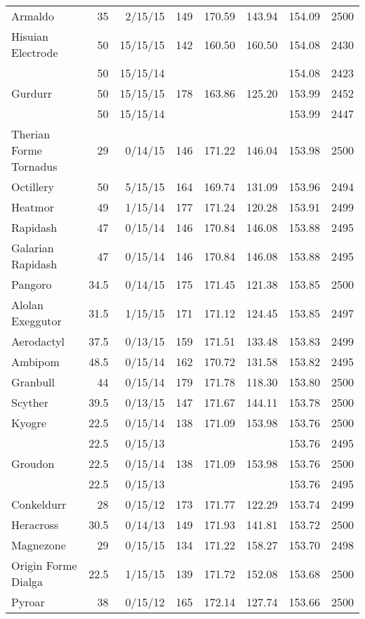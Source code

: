 \begin{longtable}{lrrrrrrr}
Armaldo & 35 & 2/15/15 & 149 & 170.59 & 143.94 & 154.09 & 2500\\
Hisuian Electrode & 50 & 15/15/15 & 142 & 160.50 & 160.50 & 154.08 & 2430\\
 & 50 & 15/15/14 & & & & 154.08 & 2423\\
Gurdurr & 50 & 15/15/15 & 178 & 163.86 & 125.20 & 153.99 & 2452\\
 & 50 & 15/15/14 & & & & 153.99 & 2447\\
Therian Forme Tornadus & 29 & 0/14/15 & 146 & 171.22 & 146.04 & 153.98 & 2500\\
Octillery & 50 & 5/15/15 & 164 & 169.74 & 131.09 & 153.96 & 2494\\
Heatmor & 49 & 1/15/14 & 177 & 171.24 & 120.28 & 153.91 & 2499\\
Rapidash & 47 & 0/15/14 & 146 & 170.84 & 146.08 & 153.88 & 2495\\
Galarian Rapidash & 47 & 0/15/14 & 146 & 170.84 & 146.08 & 153.88 & 2495\\
Pangoro & 34.5 & 0/14/15 & 175 & 171.45 & 121.38 & 153.85 & 2500\\
Alolan Exeggutor & 31.5 & 1/15/15 & 171 & 171.12 & 124.45 & 153.85 & 2497\\
Aerodactyl & 37.5 & 0/13/15 & 159 & 171.51 & 133.48 & 153.83 & 2499\\
Ambipom & 48.5 & 0/15/14 & 162 & 170.72 & 131.58 & 153.82 & 2495\\
Granbull & 44 & 0/15/14 & 179 & 171.78 & 118.30 & 153.80 & 2500\\
Scyther & 39.5 & 0/13/15 & 147 & 171.67 & 144.11 & 153.78 & 2500\\
Kyogre & 22.5 & 0/15/14 & 138 & 171.09 & 153.98 & 153.76 & 2500\\
 & 22.5 & 0/15/13 & & & & 153.76 & 2495\\
Groudon & 22.5 & 0/15/14 & 138 & 171.09 & 153.98 & 153.76 & 2500\\
 & 22.5 & 0/15/13 & & & & 153.76 & 2495\\
Conkeldurr & 28 & 0/15/12 & 173 & 171.77 & 122.29 & 153.74 & 2499\\
Heracross & 30.5 & 0/14/13 & 149 & 171.93 & 141.81 & 153.72 & 2500\\
Magnezone & 29 & 0/15/15 & 134 & 171.22 & 158.27 & 153.70 & 2498\\
Origin Forme Dialga & 22.5 & 1/15/15 & 139 & 171.72 & 152.08 & 153.68 & 2500\\
Pyroar & 38 & 0/15/12 & 165 & 172.14 & 127.74 & 153.66 & 2500\\

\end{longtable}
